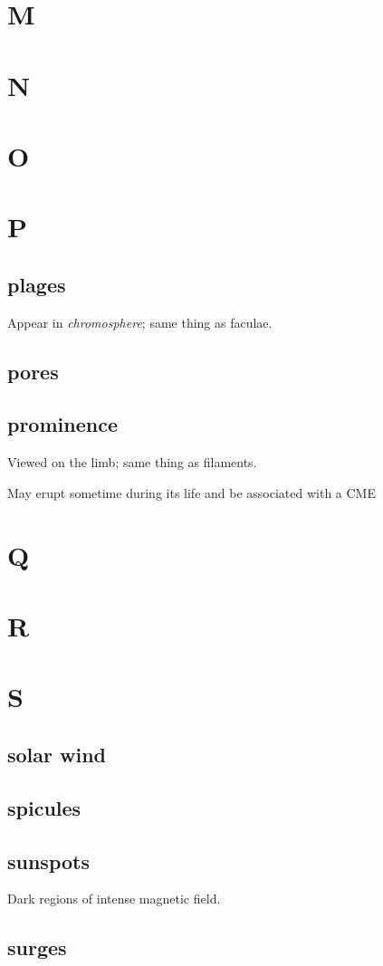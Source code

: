 \documentclass[12pt]{article}
\begin{document}
\section{M}
\section{N}
\section{O}

\section{P}

\subsection*{plages}
    \begin{itemize*}
        \item Appear in \emph{chromosphere}; same thing as faculae.
    \end{itemize*}

\subsection*{pores}

\subsection*{prominence}
    \begin{itemize*}
        \item Viewed on the limb; same thing as filaments.
        \item May erupt sometime during its life and be associated
        with a CME
    \end{itemize*}

\section{Q}
\section{R}

\section{S}

\subsection*{solar wind}

\subsection*{spicules}

\subsection*{sunspots}
Dark regions of intense magnetic field.

\subsection*{surges}
\end{document}
